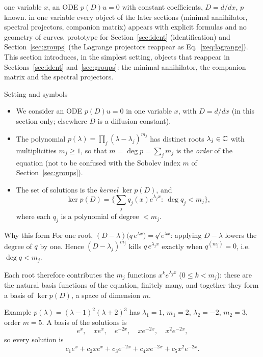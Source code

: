 \sectionbrief
{one variable $x$, an ODE $p(D)u=0$ with constant coefficients, $D=d/dx$, $p$ known.}
{in one variable every object of the later sections (minimal annihilator, spectral projectors, companion matrix) appears with explicit formulas and no geometry of curves.}
{prototype for Section~\ref{sec:ident} (identification) and Section~\ref{sec:groups} (the Lagrange projectors reappear as Eq.~\eqref{xeq:lagrange}).}
This section introduces, in the simplest setting, objects that reappear in Sections~\ref{sec:ident} and~\ref{sec:groups}: the minimal annihilator, the companion matrix and the spectral projectors.

\begin{notebox}{Setting and symbols}
\begin{itemize}[nosep]
\item We consider an ODE $p(D)u=0$ in one variable $x$, with $D=d/dx$ (in this section only; elsewhere $D$ is a diffusion constant).
\item The polynomial $p(\lambda)=\prod_j(\lambda-\lambda_j)^{m_j}$ has distinct roots $\lambda_j\in\mathbb{C}$ with multiplicities $m_j\ge1$, so that $m=\deg p=\sum_jm_j$ is the \emph{order} of the equation (not to be confused with the Sobolev index $m$ of Section~\ref{sec:groups}).
\item The set of solutions is the \emph{kernel} $\ker p(D)$, and
\[
\ker p(D)=\Big\{\sum_jq_j(x)e^{\lambda_jx}:\ \deg q_j<m_j\Big\},
\]
where each $q_j$ is a polynomial of degree $<m_j$.
\end{itemize}
\end{notebox}

\begin{aside}{Why this form}
For one root, $(D-\lambda)\big(q\,e^{\lambda x}\big)=q'e^{\lambda x}$: applying $D-\lambda$ lowers the degree of $q$ by one. Hence $(D-\lambda_j)^{m_j}$ kills $q\,e^{\lambda_jx}$ exactly when $q^{(m_j)}=0$, i.e.\ $\deg q<m_j$.

Each root therefore contributes the $m_j$ functions $x^ke^{\lambda_jx}$ ($0\le k<m_j$): these are the natural basis functions of the equation, finitely many, and together they form a basis of $\ker p(D)$, a space of dimension $m$.
\end{aside}

\begin{aside}{Example}
$p(\lambda)=(\lambda-1)^2(\lambda+2)^3$ has $\lambda_1=1$, $m_1=2$, $\lambda_2=-2$, $m_2=3$, order $m=5$. A basis of the solutions is
\[
e^{x},\quad xe^{x},\quad e^{-2x},\quad xe^{-2x},\quad x^2e^{-2x},
\]
so every solution is
\[
c_1e^{x}+c_2xe^{x}+c_3e^{-2x}+c_4xe^{-2x}+c_5x^2e^{-2x}.
\]
\end{aside}


